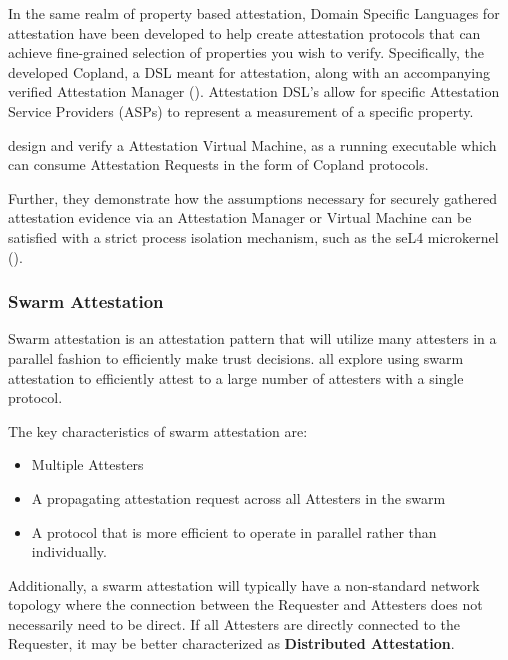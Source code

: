 \documentclass[acmsmall]{acmart}
\theoremstyle{definition}
\begin{document}
In the same realm of property based attestation, Domain Specific Languages for attestation have been developed to help create attestation protocols that can achieve fine-grained selection of properties you wish to verify. Specifically, the
\citet{copland-lang} developed Copland, a DSL meant for attestation,
along with an accompanying verified Attestation Manager (\citet{copland-avm-github}).
Attestation DSL's allow for specific Attestation Service Providers (ASPs) to represent a measurement of a
specific property.

\citet{petz2022innovations} design and verify a Attestation Virtual Machine, as a running executable which can consume Attestation Requests in the form of Copland protocols.

Further, they demonstrate how the assumptions necessary for securely gathered attestation evidence
via an Attestation Manager or Virtual Machine can be satisfied with a strict process isolation mechanism, such as the seL4 microkernel (\citet{Klein:09:seL4:-formal-ve}).

\subsubsection{Swarm Attestation} \label{sec:Swarm-Attestation}
Swarm attestation is an attestation pattern that will utilize many attesters
in a parallel fashion to efficiently make trust decisions. \citet{ kuang2019esdra,carpent2017lightweight,Wedaj:2019:DDA:3328797.3325822}
all explore using swarm attestation to efficiently attest to a
large number of attesters with a single protocol.

\begin{flushleft}

  The key characteristics of swarm attestation are:
  \begin{itemize}
    \item Multiple Attesters
    \item A propagating attestation request across all Attesters in the swarm
    \item A protocol that is more efficient to operate in parallel rather than individually.
  \end{itemize}

  Additionally, a swarm attestation will typically have a
  non-standard network topology where the connection
  between the Requester and Attesters does not necessarily
  need to be direct. If all Attesters are directly connected
  to the Requester, it may be better characterized as
  \textbf{Distributed Attestation}.
\end{flushleft}
\end{document}
